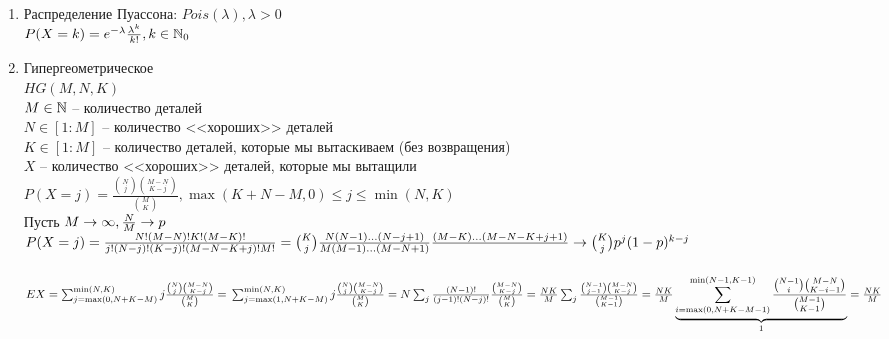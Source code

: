 \documentclass[12pt]{article}
\begin{document}
\begin{enumerate}
    \item Распределение Пуассона: $Pois(\lambda), \lambda > 0$\\
    $P(X = k) = e^{-\lambda}\frac{\lambda^k}{k!}, k \in \Nset_0$
    \item Гипергеометрическое\\
    $HG(M, N, K)$\\
    $M \in \Nset$ -- количество деталей\\
    $N \in [1:M]$ -- количество <<хороших>> деталей\\
    $K \in [1:M]$ -- количество деталей, которые мы вытаскиваем (без возвращения)\\
    $X$ -- количество <<хороших>> деталей, которые мы вытащили\\
    $P(X = j) = \frac{\binom{N}{j}\binom{M-N}{K-j}}{\binom{M}{K}}, \max(K + N - M, 0) \leq j \leq \min(N, K)$\\
    Пусть $M \rto \infty, \frac{N}{M} \rto p$\\
    $P(X=j) = \frac{N!(M-N)!K!(M-K)!}{j!(N-j)!(K-j)!(M-N-K+j)! M!} \\
    = \binom{K}{j}\frac{N(N-1)\ldots (N-j+1)}{M(M-1)\ldots (M-N + 1)} \frac{(M-K)\ldots (M - N - K + j + 1)}{} \rto \binom{K}{j} p^j(1-p)^{k-j}$\\\\
    $EX = \sum_{j = \max(0, N + K - M)}^{\min(N, K)} j \frac{\binom Nj \binom{M-N}{K-j}}{\binom{M}{K}} = \\
    \sum_{j = \max(1, N + K - M)}^{\min(N, K)} j \frac{\binom Nj \binom{M-N}{K-j}}{\binom{M}{K}} = \\
    N\sum_{j} \frac{(N-1)!}{(j-1)!(N-j)!}\frac{\binom{M-N}{K-j}}{\binom{M}{K}} = \\
    \frac {NK}{M}\sum_{j} \frac{\binom{N-1}{j-1}\binom{M-N}{K-j}}{\binom{M-1}{K-1}} = \\
    \frac{NK}{M} \ub{1}{\sum_{i = \max(0, N + K - M - 1)}^{\min(N-1, K-1)} \frac{\binom{N-1}{i}\binom{M-N}{K-i-1}}{\binom{M-1}{K-1}}} = \frac{NK}{M}$
\end{enumerate}
\end{document}
